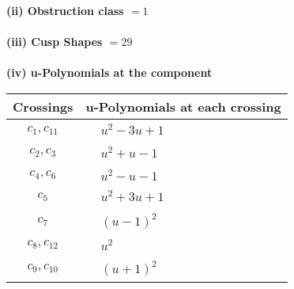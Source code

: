 \documentclass[1p]{elsarticle_modified}
\theoremstyle{definition}
\begin{document}
\flushleft \textbf{(ii) Obstruction class $= 1$}\\~\\
\flushleft \textbf{(iii) Cusp Shapes $= 29$}\\~\\
\newpage\renewcommand{\arraystretch}{1}
\flushleft \textbf{(iv) u-Polynomials at the component}\newline \\
\begin{tabular}{m{50pt}|m{274pt}}
Crossings & \hspace{64pt}u-Polynomials at each crossing \\
\hline $$\begin{aligned}c_{1},c_{11}\end{aligned}$$&$\begin{aligned}
&u^2-3 u+1
\end{aligned}$\\
\hline $$\begin{aligned}c_{2},c_{3}\end{aligned}$$&$\begin{aligned}
&u^2+u-1
\end{aligned}$\\
\hline $$\begin{aligned}c_{4},c_{6}\end{aligned}$$&$\begin{aligned}
&u^2- u-1
\end{aligned}$\\
\hline $$\begin{aligned}c_{5}\end{aligned}$$&$\begin{aligned}
&u^2+3 u+1
\end{aligned}$\\
\hline $$\begin{aligned}c_{7}\end{aligned}$$&$\begin{aligned}
&(u-1)^2
\end{aligned}$\\
\hline $$\begin{aligned}c_{8},c_{12}\end{aligned}$$&$\begin{aligned}
&u^2
\end{aligned}$\\
\hline $$\begin{aligned}c_{9},c_{10}\end{aligned}$$&$\begin{aligned}
&(u+1)^2
\end{aligned}$\\
\hline
\end{tabular}\\~\\
\end{document}
